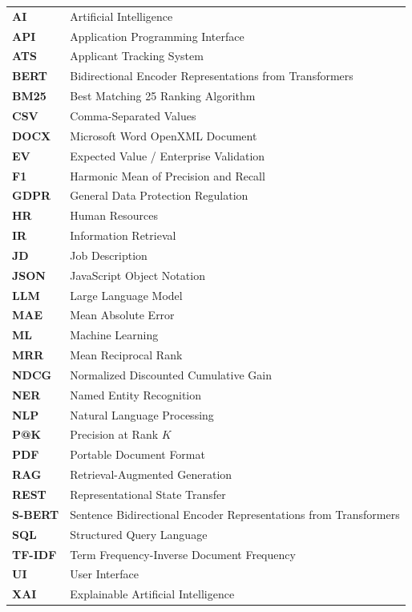 \documentclass[12pt,a4paper]{report}
\begin{document}
\begin{tabular}{p{3cm} p{11cm}}
\textbf{AI} & Artificial Intelligence \\
\textbf{API} & Application Programming Interface \\
\textbf{ATS} & Applicant Tracking System \\
\textbf{BERT} & Bidirectional Encoder Representations from Transformers \\
\textbf{BM25} & Best Matching 25 Ranking Algorithm \\
\textbf{CSV} & Comma-Separated Values \\
\textbf{DOCX} & Microsoft Word OpenXML Document \\
\textbf{EV} & Expected Value / Enterprise Validation \\
\textbf{F1} & Harmonic Mean of Precision and Recall \\
\textbf{GDPR} & General Data Protection Regulation \\
\textbf{HR} & Human Resources \\
\textbf{IR} & Information Retrieval \\
\textbf{JD} & Job Description \\
\textbf{JSON} & JavaScript Object Notation \\
\textbf{LLM} & Large Language Model \\
\textbf{MAE} & Mean Absolute Error \\
\textbf{ML} & Machine Learning \\
\textbf{MRR} & Mean Reciprocal Rank \\
\textbf{NDCG} & Normalized Discounted Cumulative Gain \\
\textbf{NER} & Named Entity Recognition \\
\textbf{NLP} & Natural Language Processing \\
\textbf{P@K} & Precision at Rank $K$ \\
\textbf{PDF} & Portable Document Format \\
\textbf{RAG} & Retrieval-Augmented Generation \\
\textbf{REST} & Representational State Transfer \\
\textbf{S-BERT} & Sentence Bidirectional Encoder Representations from Transformers \\
\textbf{SQL} & Structured Query Language \\
\textbf{TF-IDF} & Term Frequency-Inverse Document Frequency \\
\textbf{UI} & User Interface \\
\textbf{XAI} & Explainable Artificial Intelligence \\
\end{tabular}
\end{document}
